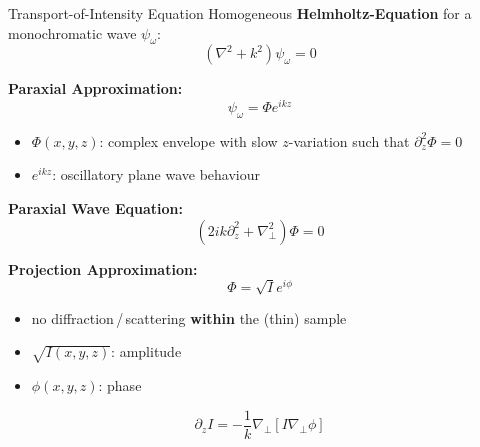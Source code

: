\documentclass[
 ]{beamer}%
\begin{document}


\begin{frame}{Transport-of-Intensity Equation}
    Homogeneous \textbf{Helmholtz-Equation} for a monochromatic wave $\psi_\omega$:
    \begin{equation*}
        \left(\nabla^2+k^2\right)\psi_\omega=0
    \end{equation*}
    
    \textbf{Paraxial Approximation:} 
    \begin{equation*}
        \psi_\omega=\Phi e^{ikz}
    \end{equation*}
    \vspace{-0.45cm} 
    \begin{itemize}
        \item $\Phi\left(x,y,z\right)$: complex envelope with slow $z$-variation such that $\partial_z^2\Phi=0$
        \item $e^{ikz}$: oscillatory plane wave behaviour
    \end{itemize}
\end{frame}


\begin{frame}
    \textbf{Paraxial Wave Equation:}
    \begin{equation*}
        \left(2ik\partial_z^2+\nabla_\perp^2\right)\Phi=0
    \end{equation*}

    \textbf{Projection Approximation:}
    \begin{equation*}
        \Phi=\sqrt{I}e^{i\phi}
    \end{equation*}
    \vspace{-0.45cm} 
    \begin{itemize}
        \item no diffraction\,/\,scattering \textbf{within} the (thin) sample
        \item $\sqrt{I(x,y,z)}$: amplitude
        \item $\phi(x,y,z)$: phase
    \end{itemize}
    \begin{equation*}
        \partial_z I=-\frac{1}{k}\nabla_\perp\left[I\nabla_\perp\phi\right]
    \end{equation*}
\end{frame}
\end{document}
